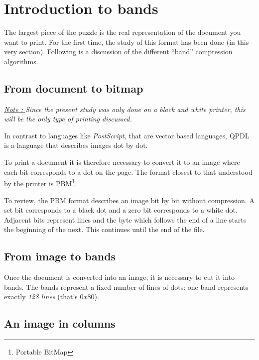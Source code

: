 \section{Introduction to bands}

%
The largest piece of the puzzle is the real representation of the document you want to print.
For the first time, the study of this format has been done (in this very section).  Following
is a discussion of the different ``band'' compression algorithms.

\subsection{From document to bitmap}

\noindent\textit{\underline{Note : }
Since the present study was only done on a black and white printer, this will
be the only type of printing discussed.}

\medskip
In contrast to languages like \emph{PostScript}, that are vector based
languages, QPDL is a language that describes images dot by dot.

To print a document it is therefore necessary to convert it to an image
where each bit corresponds to a dot on the page.  The format closest to
that understood by the printer is PBM\footnote{Portable BitMap}.

To review, the PBM format describes an image bit by bit without compression. A set bit corresponds to a black dot and a zero bit corresponds to a white dot. Adjacent bits represent lines and the byte
which follows the end of a line starts the beginning of the next.  This continues until the
end of the file.

\subsection{From image to bands}

Once the document is converted into an image, it is necessary to cut it
into bands.  The bands represent a fixed number of lines of dots: one band
represents exactly \emph{128 lines} (that's $0x80$).

\subsection{An image in columns}

